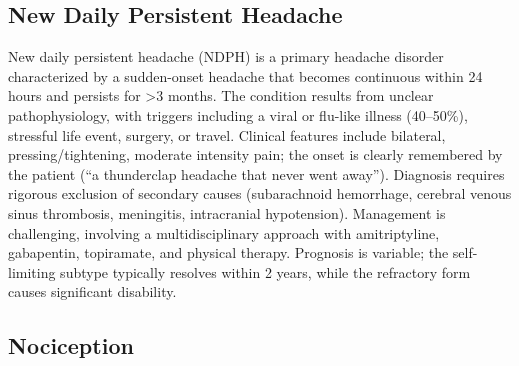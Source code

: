 \subsection{New Daily Persistent Headache}
\label{sec:New Daily Persistent Headache}
New daily persistent headache (NDPH) is a primary headache disorder characterized by a sudden-onset headache that becomes continuous within 24 hours and persists for >3 months. The condition results from unclear pathophysiology, with triggers including a viral or flu-like illness (40--50\%), stressful life event, surgery, or travel. Clinical features include bilateral, pressing/tightening, moderate intensity pain; the onset is clearly remembered by the patient (``a thunderclap headache that never went away''). Diagnosis requires rigorous exclusion of secondary causes (subarachnoid hemorrhage, cerebral venous sinus thrombosis, meningitis, intracranial hypotension). Management is challenging, involving a multidisciplinary approach with amitriptyline, gabapentin, topiramate, and physical therapy. Prognosis is variable; the self-limiting subtype typically resolves within 2 years, while the refractory form causes significant disability.

\subsection{Nociception}
\label{sec:Nociception}

